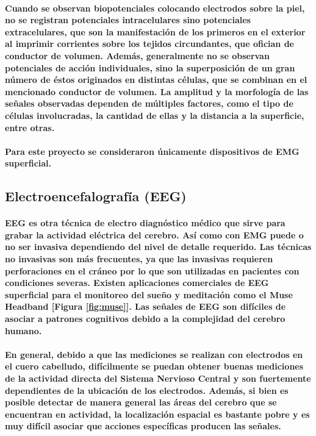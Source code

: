 \documentclass{article}
\begin{document}
\paragraph{
Cuando se observan biopotenciales colocando electrodos sobre la piel, no se registran potenciales intracelulares sino potenciales extracelulares, que son la manifestación de los primeros en el exterior al imprimir
corrientes sobre los tejidos circundantes, que ofician de conductor de volumen. Además, generalmente no se observan potenciales de acción individuales, sino la superposición de un gran número de éstos originados en distintas células, que se combinan en el mencionado conductor de volumen. La amplitud y la morfología de las señales observadas dependen de múltiples factores, como el tipo de células involucradas, la cantidad de ellas y la distancia a la superficie, entre otras. \cite{haberman2016}
}
\paragraph{
Para este proyecto se consideraron únicamente dispositivos de EMG superficial.
}

\subsection{Electroencefalografía (EEG)}
\paragraph{
EEG es otra técnica de electro diagnóstico médico que sirve para grabar la actividad eléctrica del cerebro. Así como con EMG puede o no ser invasiva dependiendo del nivel de detalle requerido. Las técnicas no invasivas son más frecuentes, ya que las invasivas requieren perforaciones en el cráneo por lo que son utilizadas en pacientes con condiciones severas. Existen aplicaciones comerciales de EEG superficial para el monitoreo del sueño y meditación como el Muse Headband [Figura \ref{fig:muse}]. Las señales de EEG son difíciles de asociar a patrones cognitivos debido a la complejidad del cerebro humano.
}
\paragraph{
En general, debido a que las mediciones se realizan con electrodos en el cuero cabelludo, difícilmente se puedan obtener buenas mediciones de la actividad directa del Sistema Nervioso Central y son fuertemente dependientes de la ubicación de los electrodos. Además, si bien es posible detectar de manera general las áreas del cerebro que se encuentran en actividad, la localización espacial es bastante pobre y es muy difícil asociar que acciones específicas producen las señales.
}
\end{document}
